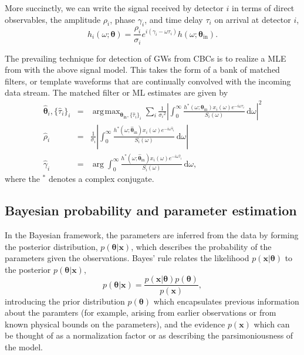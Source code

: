 \documentclass{iopart}
\DeclareMathOperator*{\argmax}{\arg\!\max}
\begin{document}
More succinctly, we can write the signal received by detector $i$ in terms of direct observables, the amplitude $\rho_i$, phase $\gamma_i$, and time delay $\tau_i$ on arrival at detector $i$,
%
\begin{equation}\label{eq:signal-model}
	h_i (\omega; \boldsymbol\theta) = \frac{\rho_i}{\sigma_i} e^{i (\gamma_i - \omega \tau_i)} h(\omega; \boldsymbol\theta_\mathrm{in}).
\end{equation}

The prevailing technique for detection of \acp{GW} from \acp{CBC} is to realize a \ac{MLE} from  with the above signal model. This takes the form of a bank of matched filters, or template waveforms that are continually convolved with the incoming data stream. The matched filter or \ac{ML} estimates are given by
%
\begin{eqnarray}
\hat{\boldsymbol\theta}_i, \{\hat\tau_i\}_i &=& \argmax_{\boldsymbol\theta_\mathrm{in}, \{\hat\tau_i\}_i} \sum_i \frac{1}{{\sigma_i}^2} \left| \int_0^\infty \frac{h^*(\omega; \boldsymbol\theta_\mathrm{in}) x_i(\omega) e^{-i \omega \tau_i}}{S_i(\omega)} \,\mathrm{d}\omega \right|^2 \\
\hat\rho_i &=& \frac{1}{\sigma_i} \left| \int_0^\infty \frac{h^*(\omega; \hat{\boldsymbol\theta}_\mathrm{in}) x_i(\omega) e^{-i \omega \hat\tau_i}}{S_i(\omega)} \,\mathrm{d}\omega \right| \\
\hat\gamma_i &=& \arg \int_0^\infty \frac{h^*(\omega; \hat{\boldsymbol\theta}_\mathrm{in}) x_i(\omega) e^{-i \omega \hat\tau_i}}{S_i(\omega)} \,\mathrm{d}\omega,
\end{eqnarray}
%
where the $^*$ denotes a complex conjugate.

\subsection{Bayesian probability and parameter estimation}

In the Bayesian framework, the parameters are inferred from the data by forming the posterior distribution, $p(\boldsymbol\theta|\mathbf x)$, which describes the probability of the parameters given the observations. Bayes' rule relates the likelihood $p(\mathbf x|\boldsymbol\theta)$ to the posterior $p(\boldsymbol\theta|\mathbf x)$,
%
\begin{equation}\label{bayes}
p(\boldsymbol\theta|\mathbf x) = \frac{p(\mathbf x|\boldsymbol\theta) p(\boldsymbol\theta)}{p(\mathbf x)},
\end{equation}
%
introducing the prior distribution $p(\boldsymbol\theta)$ which encapsulates previous information about the paramters (for example, arising from earlier observations or from known physical bounds on the parameters), and the evidence $p(\mathbf x)$ which can be thought of as a normalization factor or as describing the parsimoniousness of the model.
\end{document}
